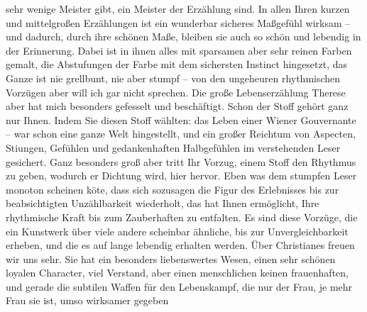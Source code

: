 \begin{ledgroupsized}[t]{13cm}
               sehr wenige Meister gibt, ein Meister der Erzählung sind. In allen Ihren kurzen und
               mittelgroßen Erzählungen ist ein wunderbar sicheres Maßgefühl wirksam – und dadurch,
               durch ihre schönen Maße, bleiben sie auch so schön und lebendig in der Erinnerung.
                  {\pb}Dabei ist in ihnen alles mit
               sparsamen aber sehr reinen Farben gemalt, die Abstufungen der Farbe mit dem
               sichersten Instinct hingesetzt, das Ganze ist nie grellbunt, nie aber stumpf – von
               den ungeheuren rhythmischen Vorzügen aber will ich gar nicht sprechen. Die große
               Lebenserzählung Therese aber hat mich besonders
               gefesselt und beschäftigt. Schon der Stoff gehört ganz nur Ihnen. Indem Sie diesen
               Stoff wählten: das Leben einer Wiener Gouvernante –
               war schon eine ganze Welt hingestellt, und ein großer Reichtum von Aspecten, Sti{\geminationm}ungen, Gefühlen und gedankenhaften Halbgefühlen im
               verstehenden Leser gesichert. Ganz besonders groß aber tritt Ihr Vorzug, einem Stoff
               den Rhythmus zu geben, wodurch er Dichtung wird, hier hervor. Eben was dem stumpfen
               Leser monoton scheinen kö{\geminationn}te, dass sich sozusagen die
               Figur des Erlebnisses bis zur beabsichtigten Unzählbarkeit wiederholt, das hat Ihnen
               ermöglicht, Ihre rhythmische Kraft bis zum Zauberhaften zu entfalten. Es sind diese
               Vorzüge, die ein Kunstwerk über viele andere scheinbar ähnliche, bis zur
               Unvergleichbarkeit erheben, und die {\pb}es auf lange lebendig erhalten
               werden.\pend
           \pstart
           Über Christianes \label{K_L02503_3v}\label{K_L02503_3h} freuen wir uns sehr. Sie
               hat ein besonders liebenswertes Wesen, einen sehr schönen loyalen Character, viel
               Verstand, aber einen menschlichen keinen frauenhaften, und gerade die subtilen Waffen
               für den Lebenskampf, die nur der Frau, je mehr Frau sie ist, umso wirksamer gegeben

\end{ledgroupsized}
